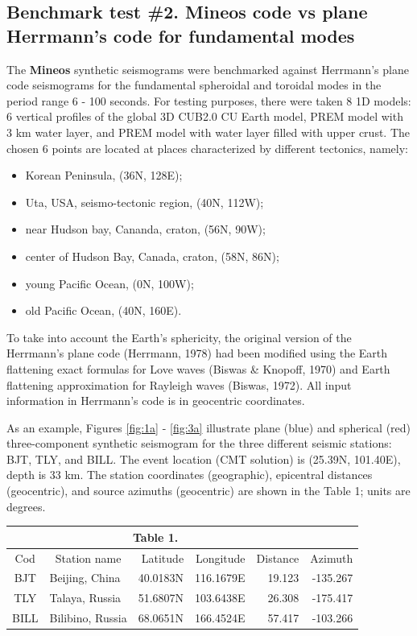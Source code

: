 \subsection{Benchmark test \#2. Mineos code vs plane Herrmann's code
for fundamental modes}
The {\bf Mineos} synthetic seismograms were benchmarked against Herrmann's plane
code seismograms for the fundamental spheroidal and toroidal modes in the period range 
6 - 100 seconds. For testing purposes, there were taken 8 1D models: 
6 vertical profiles of the global 3D CUB2.0 CU Earth model, PREM
model with 3 km water layer, and PREM model with water layer filled with
upper crust. The chosen 6 points are located at
places characterized by different tectonics, namely:
\begin{itemize}
\item Korean Peninsula, (36N, 128E);
\item Uta, USA, seismo-tectonic region, (40N, 112W);
\item near Hudson bay, Cananda, craton, (56N, 90W);
\item center of Hudson Bay, Canada, craton, (58N, 86N);
\item young Pacific Ocean, (0N, 100W);
\item old Pacific Ocean, (40N, 160E).
\end{itemize}
To take into account the Earth's sphericity, the original version of the 
Herrmann's plane code (Herrmann, 1978) had been modified using the Earth 
flattening exact formulas for Love waves (Biswas \& Knopoff, 1970) and Earth 
flattening approximation for Rayleigh waves (Biswas, 1972). All input
information in Herrmann's code is in geocentric coordinates.

\noindent As an example, Figures \ref{fig:1a} - \ref{fig:3a} illustrate plane 
(blue) and spherical (red) 
three-component synthetic seismogram for the three different seismic stations: 
BJT, TLY, and BILL.
The event location (CMT solution) is (25.39N, 101.40E), depth is 33 km.
The station coordinates (geographic),  epicentral distances (geocentric), 
and source azimuths (geocentric) are shown in the Table 1;  units are degrees.

\begin{center}
\begin{tabular}{|c|c|r|r|r|r|}
\multicolumn{5}{c}{{\bf Table 1.}}  \\ \hline
Cod & Station name & Latitude & Longitude & Distance & Azimuth \\ \cline{1-6}
BJT & \multicolumn{1}{l|}{{Beijing, China}} & 40.0183N & 116.1679E & 19.123 & -135.267 \\
TLY & \multicolumn{1}{l|}{{Talaya, Russia}} & 51.6807N & 103.6438E & 26.308 & -175.417 \\
BILL & \multicolumn{1}{l|}{{Bilibino, Russia}} & 68.0651N & 166.4524E & 57.417 & -103.266 \\ \hline
\end{tabular}
\end{center}

